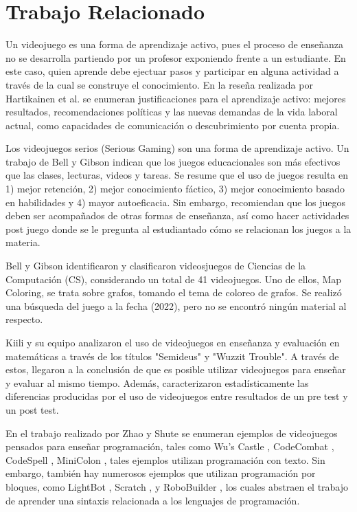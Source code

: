 \chapter{Trabajo Relacionado}


Un videojuego es una forma de aprendizaje activo, pues el proceso de enseñanza no se desarrolla partiendo por un profesor exponiendo frente a un estudiante. En este caso, quien aprende debe ejectuar pasos y participar en alguna actividad a través de la cual se construye el conocimiento. En la reseña realizada por Hartikainen et al. \cite{active_learning_review} se enumeran justificaciones para el aprendizaje activo:  mejores resultados, recomendaciones políticas y las nuevas demandas de la vida laboral actual, como capacidades de comunicación o descubrimiento por cuenta propia. 

Los videojuegos serios (Serious Gaming) son una forma de aprendizaje activo. Un trabajo de Bell y Gibson \cite{evaluation_of_games_for_teaching_cs} indican que los juegos educacionales son más efectivos que las clases, lecturas, videos y tareas. Se resume que el uso de juegos resulta en 1) mejor retención, 2) mejor conocimiento fáctico, 3) mejor conocimiento basado en habilidades y 4) mayor autoeficacia. Sin embargo, recomiendan que los juegos  deben ser acompañados de otras formas de enseñanza, así como hacer actividades post juego donde se le pregunta al estudiantado cómo se relacionan los juegos a la materia.

Bell y Gibson \cite{evaluation_of_games_for_teaching_cs} identificaron y clasificaron videosjuegos de Ciencias de la Computación (CS), considerando un total de 41 videojuegos. Uno de ellos, Map Coloring, se trata sobre grafos, tomando el tema de coloreo de grafos. Se realizó una búsqueda del juego a la fecha (2022), pero no se encontró ningún material al respecto.

Kiili y su equipo \cite{using_videogames_maths} analizaron el uso de videojuegos en enseñanza y evaluación en matemáticas a través de los títulos "Semideus" y "Wuzzit Trouble". A través de estos, llegaron a la conclusión de que es posible utilizar videojuegos para enseñar y evaluar al mismo tiempo. Además, caracterizaron estadísticamente las diferencias producidas por el uso de videojuegos entre resultados de un pre test y un post test.

En el trabajo realizado por Zhao y Shute \cite{video_game_foster_computational_thinking} se enumeran ejemplos de videojuegos pensados para enseñar programación, tales como Wu's Castle \cite{wuscastle}, CodeCombat \cite{CodeCombat}, CodeSpell \cite{codespells}, MiniColon \cite{minicolon}, tales ejemplos utilizan programación con texto. Sin embargo, también hay numerosos ejemplos que utilizan programación por bloques, como LightBot \cite{LightBot}, Scratch \cite{maloney2010scratch}, \cite{scratch} y RoboBuilder \cite{RoboBuilder}, los cuales abstraen el trabajo de aprender una sintaxis relacionada a los lenguajes de programación.

